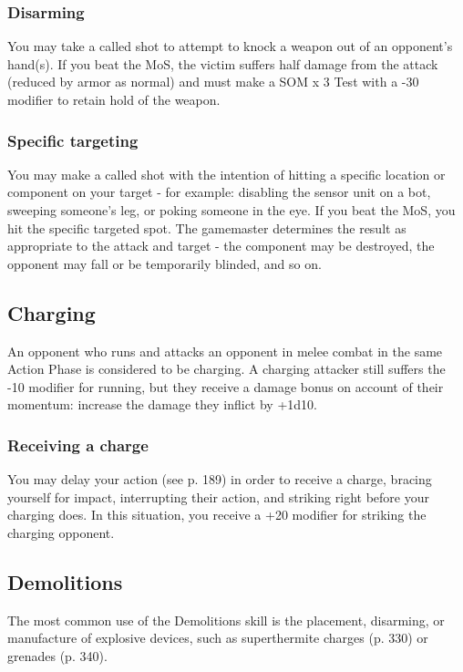 \subsubsection{Disarming}

You may take a called shot to attempt to knock a weapon out of an opponent’s hand(s). If you beat the MoS, the victim suffers half damage from the attack (reduced by armor as normal) and must make a SOM x 3 Test with a -30 modifier to retain hold of the weapon.

\subsubsection{Specific targeting}

You may make a called shot with the intention of hitting a specific location or component on your target - for example: disabling the sensor unit on a bot, sweeping someone’s leg, or poking someone in the eye. If you beat the MoS, you hit the specific targeted spot. The gamemaster determines the result as appropriate to the attack and target - the component may be destroyed, the opponent may fall or be temporarily blinded, and so on.

\subsection{Charging}
\label{sec:charging}

An opponent who runs and attacks an opponent in melee combat in the same Action Phase is considered to be charging. A charging attacker still suffers the -10 modifier for running, but they receive a damage bonus on account of their momentum: increase the damage they inflict by +1d10.

\subsubsection{Receiving a charge}

You may delay your action (see p. 189) in order to receive a charge, bracing yourself for impact, interrupting their action, and striking right before your charging does. In this situation, you receive a +20 modifier for striking the charging opponent.


\subsection{Demolitions}
\label{sec:demolitions}

The most common use of the Demolitions skill is the placement, disarming, or manufacture of explosive devices, such as superthermite charges (p. 330) or grenades (p. 340).

